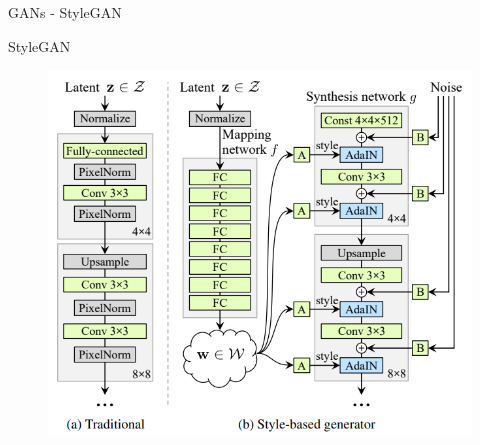 \documentclass[t]{beamer}
\begin{document}
\begin{frame}[c]{GANs - StyleGAN}
  \begin{block}{StyleGAN}
  \begin{figure}[ht!]
    \centering
    \includegraphics[scale=0.42]{stylegan-scheme.PNG}
\end{figure} 
  \end{block}
\end{frame}
\end{document}
